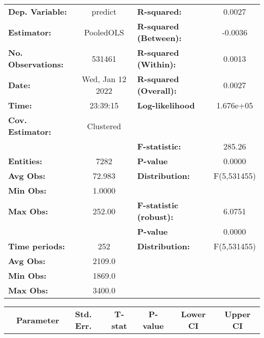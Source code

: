 \begin{center}
\begin{tabular}{lclc}
\toprule
\textbf{Dep. Variable:}    &      predict       & \textbf{  R-squared:         }   &      0.0027      \\
\textbf{Estimator:}        &     PooledOLS      & \textbf{  R-squared (Between):}  &     -0.0036      \\
\textbf{No. Observations:} &       531461       & \textbf{  R-squared (Within):}   &      0.0013      \\
\textbf{Date:}             &  Wed, Jan 12 2022  & \textbf{  R-squared (Overall):}  &      0.0027      \\
\textbf{Time:}             &      23:39:15      & \textbf{  Log-likelihood     }   &    1.676e+05     \\
\textbf{Cov. Estimator:}   &     Clustered      & \textbf{                     }   &                  \\
\textbf{}                  &                    & \textbf{  F-statistic:       }   &      285.26      \\
\textbf{Entities:}         &        7282        & \textbf{  P-value            }   &      0.0000      \\
\textbf{Avg Obs:}          &       72.983       & \textbf{  Distribution:      }   &   F(5,531455)    \\
\textbf{Min Obs:}          &       1.0000       & \textbf{                     }   &                  \\
\textbf{Max Obs:}          &       252.00       & \textbf{  F-statistic (robust):} &      6.0751      \\
\textbf{}                  &                    & \textbf{  P-value            }   &      0.0000      \\
\textbf{Time periods:}     &        252         & \textbf{  Distribution:      }   &   F(5,531455)    \\
\textbf{Avg Obs:}          &       2109.0       & \textbf{                     }   &                  \\
\textbf{Min Obs:}          &       1869.0       & \textbf{                     }   &                  \\
\textbf{Max Obs:}          &       3400.0       & \textbf{                     }   &                  \\
\bottomrule
\end{tabular}
\begin{tabular}{lcccccc}
                & \textbf{Parameter} & \textbf{Std. Err.} & \textbf{T-stat} & \textbf{P-value} & \textbf{Lower CI} & \textbf{Upper CI}  \\

\end{tabular}
\end{center}
